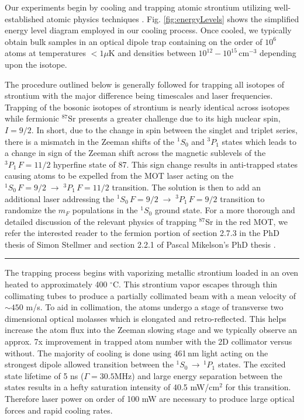 Our experiments begin by cooling and trapping atomic strontium utilizing well-established atomic physics techniques \cite{Metcalf1999,Katori1999,Ido2000,Nagel2003,Mukaiyama2003a,Loftus2004,mmy09a,sth09a,Mickelson2010ja,Tey2010a,dym10a,stg10}. 
Fig. \;\ref{fig:energyLevels} shows the simplified energy level diagram employed in our cooling process. 
Once cooled, we typically obtain bulk samples in an optical dipole trap containing on the order of $10^6$ atoms at temperatures $<1\mu$K and densities between $10^{12} - 10^{15}\,$cm$^{-3}$ depending upon the isotope. 

The procedure outlined below is generally followed for trapping all isotopes of strontium with the major difference being timescales and laser frequencies.
Trapping of the bosonic isotopes of strontium is nearly identical across isotopes while fermionic $^{87}$Sr presents a greater challenge due to its high nuclear spin, $I=9/2$.
In short, due to the change in spin between the singlet and triplet series, there is a mismatch in the Zeeman shifts of the $^1S_0$ and $^3P_1$ states which leads to a change in sign of the Zeeman shift across the magnetic sublevels of the $^3P_1\,F=11/2$ hyperfine state of 87.
This sign change results in anti-trapped states causing atoms to be expelled from the MOT laser acting on the $^1S_0\,F=9/2\;\rightarrow\;^3P_1\,F=11/2$ transition.
The solution is then to add an additional laser addressing the $^1S_0\,F=9/2\;\rightarrow\;^3P_1\,F=9/2$ transition to randomize the $m_F$ populations in the $^1S_0$ ground state.
For a more thorough and detailed discussion of the relevant physics of trapping $^{87}$Sr in the red MOT, we refer the interested reader to the fermion portion of section 2.7.3 in the PhD thesis of Simon Stellmer \cite{SimonStellmer2013} and section 2.2.1 of Pascal Mikelson's PhD thesis \cite{Mickelson2010b}.

\noindent \rule{75pt}{0.5pt} \newline
The trapping process begins with vaporizing metallic strontium loaded in an oven heated to approximately 400 $^{\circ}$C. 
This strontium vapor escapes through thin collimating tubes to produce a partially collimated beam with a mean velocity of $\sim450$ m/s.
To aid in collimation, the atoms undergo a stage of transverse two dimensional optical molasses which is elongated and retro-reflected.
This helps increase the atom flux into the Zeeman slowing stage and we typically observe an approx. 7x improvement in trapped atom number with the 2D collimator versus without.
The majority of cooling is done using 461\,nm light acting on the strongest dipole allowed transition between the $^1S_0\,\rightarrow\,^1P_1$ states.
The excited state lifetime of 5 ns ($\Gamma=30.5$MHz) and large energy separation between the states results in a hefty saturation intensity of 40.5 mW/cm$^2$ for this transition.
Therefore laser power on order of 100 mW are necessary to produce large optical forces and rapid cooling rates.


